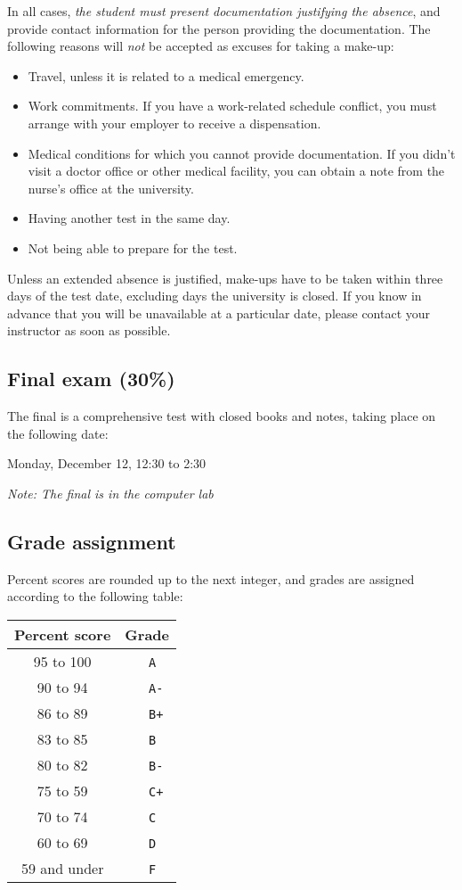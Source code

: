 \documentclass[11pt]{article}
\begin{document}
In all cases, \emph{the student must present documentation justifying the absence}, and provide contact information for the person providing the documentation. The following reasons will \emph{not} be accepted as excuses for taking a make-up:
\begin{itemize}
\item Travel, unless it is related to a medical emergency.
\item Work commitments. If you have a work-related schedule conflict, you must arrange with your employer to receive a dispensation.
\item Medical conditions for which you cannot provide documentation. If you didn't visit a doctor office or other medical facility, you can obtain a note from the nurse's office at the university.
\item Having another test in the same day.
\item Not being able to prepare for the test.
\end{itemize}

Unless an extended absence is justified, make-ups have to be taken within three days of the test date, excluding days the university is closed. If you know in advance that you will be unavailable at a particular date, please contact your instructor as soon as possible.


\subsection{Final exam (30\%)} The final is a comprehensive test with closed books and notes, taking place on the following date:

\begin{center}
{\Large Monday, December 12, 12:30 to 2:30}

\emph{Note: The final is in the computer lab}
\end{center}

\subsection{Grade assignment} Percent scores are rounded up to the next integer, and grades are assigned according to the following table:

\begin{center}
  \begin{tabular}{c|cl}
    \hline
    \textbf{Percent score} & \multicolumn{2}{c}{\textbf{Grade}}\\
    \hline
    95 to 100	&& \ \texttt{A}\\
    90 to 94 	&& \ \texttt{A-}\\
    86 to 89 	&& \ \texttt{B+}\\
    83 to 85	&& \ \texttt{B}  \\
    80 to 82	&& \ \texttt{B-} \\
    75 to 59	&& \ \texttt{C+} \\
    70 to 74	&& \ \texttt{C}  \\
    60 to 69	&& \ \texttt{D}  \\
    59 and under && \ \texttt{F}
  \end{tabular}
\end{center}
\end{document}
